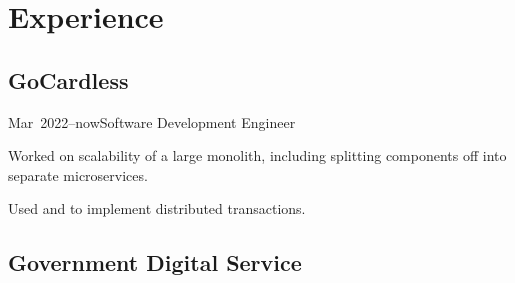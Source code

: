 \documentclass[a4paper]{barrucadu-cv}
\newcommand{\range}[2]{#1–#2}
\newcommand{\orange}[1]{\range{#1}{now}}
\begin{document}
\section{Experience}

\subsection{GoCardless}
\begin{cventry}{\orange{Mar~2022}}{Software Development Engineer}
  \begin{tightitemize}
  \item Worked on scalability of a large  monolith,
    including splitting components off into separate microservices.
  \item Used  and 
    to implement distributed transactions.
  \end{tightitemize}
\end{cventry}

\subsection{Government Digital Service}
\end{document}
